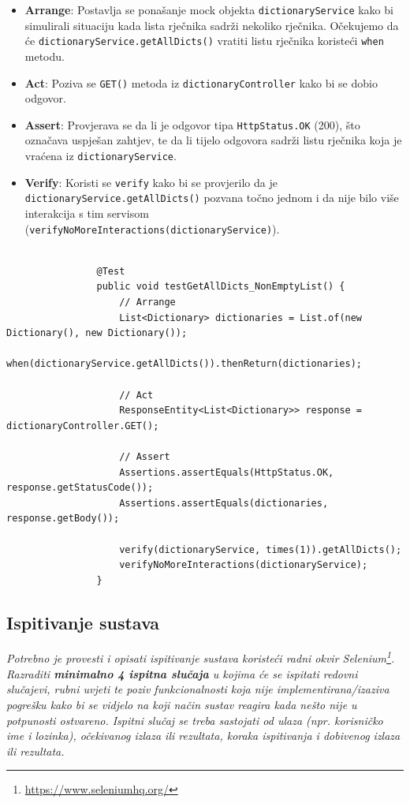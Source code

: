 			\begin{itemize}
				\item \textbf{Arrange}: Postavlja se ponašanje mock objekta \texttt{dictionaryService} kako bi simulirali situaciju kada lista rječnika sadrži nekoliko rječnika. Očekujemo da će \texttt{dictionaryService.getAllDicts()} vratiti listu rječnika koristeći \texttt{when} metodu.
				
				\item \textbf{Act}: Poziva se \texttt{GET()} metoda iz \texttt{dictionaryController} kako bi se dobio odgovor.
				
				\item \textbf{Assert}: Provjerava se da li je odgovor tipa \texttt{HttpStatus.OK} (200), što označava uspješan zahtjev, te da li tijelo odgovora sadrži listu rječnika koja je vraćena iz \texttt{dictionaryService}.
				
				\item \textbf{Verify}: Koristi se \texttt{verify} kako bi se provjerilo da je \texttt{dictionaryService.getAllDicts()} pozvana točno jednom i da nije bilo više interakcija s tim servisom (\texttt{verifyNoMoreInteractions(dictionaryService)}).
			\end{itemize}

			\begin{lstlisting}

				@Test
				public void testGetAllDicts_NonEmptyList() {
					// Arrange
					List<Dictionary> dictionaries = List.of(new Dictionary(), new Dictionary());
					when(dictionaryService.getAllDicts()).thenReturn(dictionaries);
			
					// Act
					ResponseEntity<List<Dictionary>> response = dictionaryController.GET();
			
					// Assert
					Assertions.assertEquals(HttpStatus.OK, response.getStatusCode());
					Assertions.assertEquals(dictionaries, response.getBody());
			
					verify(dictionaryService, times(1)).getAllDicts();
					verifyNoMoreInteractions(dictionaryService);
				}

			\end{lstlisting}

			\subsection{Ispitivanje sustava}
			
			 \textit{Potrebno je provesti i opisati ispitivanje sustava koristeći radni okvir Selenium\footnote{\url{https://www.seleniumhq.org/}}. Razraditi \textbf{minimalno 4 ispitna slučaja} u kojima će se ispitati redovni slučajevi, rubni uvjeti te poziv funkcionalnosti koja nije implementirana/izaziva pogrešku kako bi se vidjelo na koji način sustav reagira kada nešto nije u potpunosti ostvareno. Ispitni slučaj se treba sastojati od ulaza (npr. korisničko ime i lozinka), očekivanog izlaza ili rezultata, koraka ispitivanja i dobivenog izlaza ili rezultata.\\ }
			 
